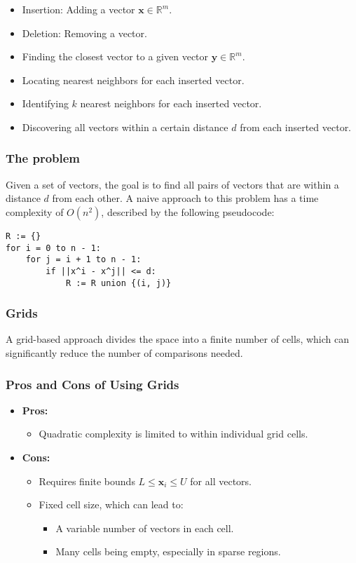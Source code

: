 \documentclass[12pt]{article}
\begin{document}
\begin{itemize}
    \item Insertion: Adding a vector $\mathbf{x} \in \mathbb{R}^m$.
    \item Deletion: Removing a vector.
    \item Finding the closest vector to a given vector $\mathbf{y} \in \mathbb{R}^m$.
    \item Locating nearest neighbors for each inserted vector.
    \item Identifying $k$ nearest neighbors for each inserted vector.
    \item Discovering all vectors within a certain distance $d$ from each inserted vector.
\end{itemize}

\subsubsection{The problem}
Given a set of vectors, the goal is to find all pairs of vectors that are within a distance $d$ from each other. A naive approach to this problem has a time complexity of $O(n^2)$, described by the following pseudocode:

\begin{lstlisting}
R := {}
for i = 0 to n - 1:
    for j = i + 1 to n - 1:
        if ||x^i - x^j|| <= d:
            R := R union {(i, j)}
\end{lstlisting}


\subsubsection{Grids}
A grid-based approach divides the space into a finite number of cells, which can significantly reduce the number of comparisons needed.

\subsubsection{Pros and Cons of Using Grids}
\begin{itemize}
    \item \textbf{Pros:}
    \begin{itemize}
        \item Quadratic complexity is limited to within individual grid cells.
    \end{itemize}
    \item \textbf{Cons:}
    \begin{itemize}
        \item Requires finite bounds $L \leq \mathbf{x}_i \leq U$ for all vectors.
        \item Fixed cell size, which can lead to:
        \begin{itemize}
            \item A variable number of vectors in each cell.
            \item Many cells being empty, especially in sparse regions.
        \end{itemize}
    \end{itemize}
\end{itemize}
\end{document}
